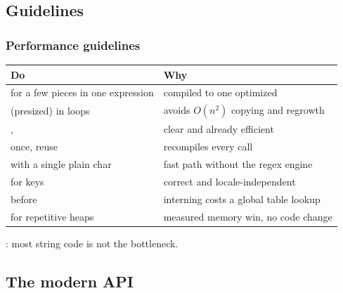 \documentclass[aspectratio=169,10pt,compress]{beamer}
\begin{document}
\subsection[Guide]{Guidelines}




\begin{frame}[t,fragile] \frametitle{Performance guidelines}
  \small
  
  \begin{tabular}{@{}L{0.44\textwidth}L{0.5\textwidth}@{}}
    \toprule
    \textbf{Do} & \textbf{Why} \\
    \midrule
    \hCode{+} for a few pieces in one expression        & compiled to one optimized  \\
     (presized) in loops            & avoids $O(n^{2})$ copying and regrowth \\
    ,      & clear and already efficient \\
     once, reuse                  &  recompiles every call \\
     with a single plain char               & fast path without the regex engine \\
     for keys            & correct and locale-independent \\
     before                 & interning costs a global table lookup \\
     for repetitive heaps & measured memory win, no code change \\
    \bottomrule
  \end{tabular}

  \vspace{0.4em}
  : most string code is not the bottleneck.
\end{frame}



\subsection[API]{The modern API}
\end{document}
